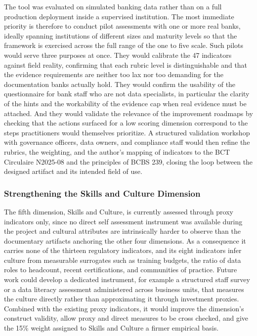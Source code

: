 The tool was evaluated on simulated banking data rather than on a full production deployment inside a supervised institution. The most immediate priority is therefore to conduct pilot assessments with one or more real banks, ideally spanning institutions of different sizes and maturity levels so that the framework is exercised across the full range of the one to five scale. Such pilots would serve three purposes at once. They would calibrate the 47 indicators against field reality, confirming that each rubric level is distinguishable and that the evidence requirements are neither too lax nor too demanding for the documentation banks actually hold. They would confirm the usability of the questionnaire for bank staff who are not data specialists, in particular the clarity of the hints and the workability of the evidence cap when real evidence must be attached. And they would validate the relevance of the improvement roadmaps by checking that the actions surfaced for a low scoring dimension correspond to the steps practitioners would themselves prioritize. A structured validation workshop with governance officers, data owners, and compliance staff would then refine the rubrics, the weighting, and the author's mapping of indicators to the BCT Circulaire N\textdegree{}2025-08 and the principles of BCBS 239, closing the loop between the designed artifact and its intended field of use.

\subsubsection{Strengthening the Skills and Culture Dimension}

The fifth dimension, Skills and Culture, is currently assessed through proxy indicators only, since no direct self assessment instrument was available during the project and cultural attributes are intrinsically harder to observe than the documentary artifacts anchoring the other four dimensions. As a consequence it carries none of the thirteen regulatory indicators, and its eight indicators infer culture from measurable surrogates such as training budgets, the ratio of data roles to headcount, recent certifications, and communities of practice. Future work could develop a dedicated instrument, for example a structured staff survey or a data literacy assessment administered across business units, that measures the culture directly rather than approximating it through investment proxies. Combined with the existing proxy indicators, it would improve the dimension's construct validity, allow proxy and direct measures to be cross checked, and give the 15\% weight assigned to Skills and Culture a firmer empirical basis.


